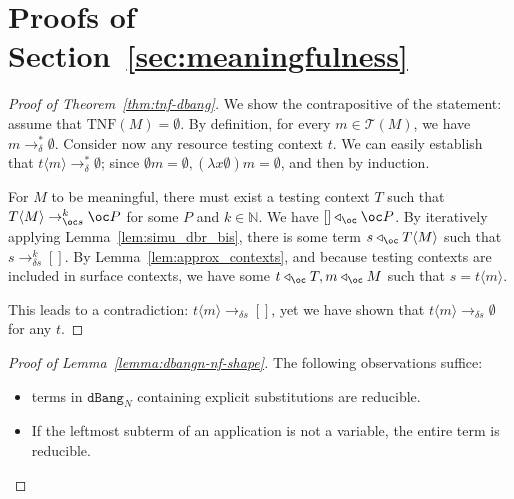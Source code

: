 \documentclass[10pt,a4paper]{article}
\newcommand{\<}{\langle}
\renewcommand{\>}{\rangle}
\newcommand{\dbang}{\ensuremath{\mathtt{dBang}}}
\newcommand{\dbangn}{\ensuremath{\dbang_N}}
\newcommand{\todbs}{\to_{\oc s}} %
\newcommand{\todbr}{\to_{\delta}} %
\newcommand{\todbrs}{\to_{\delta s}} %
\newcommand{\app}{\triangleleft_\oc} %
\newcommand{\taylor}[1]{\ensuremath{\mathcal{T}(#1)}}
\newcommand{\taylornf}[1]{\ensuremath{\text{TNF}(#1)}}
\newcommand{\nativeemdash}{\ifmmode\text{\textemdash}\else\textemdash\fi}
\begin{document}
\section{Proofs of Section~\ref{sec:meaningfulness}}
\label{appendix:meaningfulness}

\begin{proof}[Proof of Theorem~\ref{thm:tnf-dbang}]
	We show the contrapositive of the statement: assume that $\taylornf
	M=\emptyset$. By definition, for every $m\in\taylor M$, we have $m\todbr^*
	\emptyset$. Consider now any resource testing context $t$. We can easily
	establish that $t\<m\>\todbr^* \emptyset $; since $\emptyset m=\emptyset,
	(\lambda x \emptyset)m=\emptyset$, and then by induction.

	For $M$ to be meaningful, there must exist a testing context $T$ such that
	$T\<M\>\todbs^k \oc P$ for some $P$ and $k\in\mathbb N$. We have
	$[]\app \oc P$. By iteratively applying 
	Lemma~\ref{lem:simu_dbr_bis}, there is some term $s\app T\<M\>$ such
	that $s\todbrs^k []$. By Lemma~\ref{lem:approx_contexts}, and because
	testing contexts are included in surface contexts, we have some $t\app
	T, m\app M$ such that $s=t\<m\>$.

	This leads to a contradiction: $t\<m\>\todbrs []$, yet we have shown
	that $t\<m\>\todbrs \emptyset$ for any $t$.
\end{proof}


\begin{proof}[Proof of Lemma~\ref{lemma:dbangn-nf-shape}]
	The following observations suffice:
	\begin{itemize}
		\item terms in \dbangn{} containing explicit substitutions are
			reducible. 
		\item If the leftmost subterm of an application is not a
		variable, the entire term is reducible. \qedhere
	\end{itemize}
\end{proof}
\end{document}
